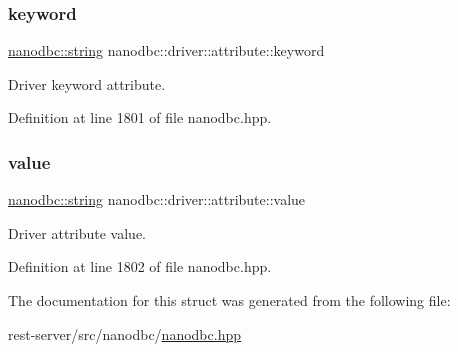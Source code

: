 \subsubsection{\texorpdfstring{keyword}{keyword}}
{\footnotesize\ttfamily \mbox{\hyperlink{namespacenanodbc_abfc0ece56278e590911ec8352774c212}{nanodbc\+::string}} nanodbc\+::driver\+::attribute\+::keyword}



Driver keyword attribute. 



Definition at line 1801 of file nanodbc.\+hpp.

\mbox{\label{structnanodbc_1_1driver_1_1attribute_abd20e9eff35a81c877c01eaac6c9adaa}} 
\subsubsection{\texorpdfstring{value}{value}}
{\footnotesize\ttfamily \mbox{\hyperlink{namespacenanodbc_abfc0ece56278e590911ec8352774c212}{nanodbc\+::string}} nanodbc\+::driver\+::attribute\+::value}



Driver attribute value. 



Definition at line 1802 of file nanodbc.\+hpp.



The documentation for this struct was generated from the following file\+:\begin{DoxyCompactItemize}
\item 
rest-\/server/src/nanodbc/\mbox{\hyperlink{nanodbc_8hpp}{nanodbc.\+hpp}}\end{DoxyCompactItemize}
